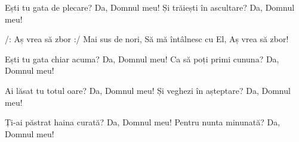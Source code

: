 \beginverse
Ești tu gata de plecare?
Da, Domnul meu!
Și trăiești în ascultare?
Da, Domnul meu!
\endverse

\beginchorus
/: Aș vrea să zbor :/
Mai sus de nori,
Să mă întâlnesc cu El,
Aș vrea să zbor!
\endchorus

\beginverse
Ești tu gata chiar acuma?
Da, Domnul meu!
Ca să poți primi cununa?
Da, Domnul meu!
\endverse

\beginverse
Ai lăsat tu totul oare?
Da, Domnul meu!
Și veghezi în așteptare?
Da, Domnul meu!
\endverse

\beginverse
Ți-ai păstrat haina curată?
Da, Domnul meu!
Pentru nunta minunată?
Da, Domnul meu!
\endverse
\endsong